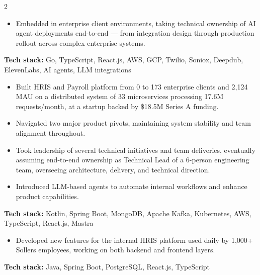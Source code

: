 \documentclass[10pt,a4paper,ragged2e,withhyper]{altacv}
\begin{document}
\begin{paracol}{2}



\begin{itemize}
  \item Embedded in enterprise client environments, taking technical ownership of AI agent deployments end-to-end — from integration design through production rollout across complex enterprise systems.
\end{itemize}
\textbf{Tech stack:} Go, TypeScript, React.js, AWS, GCP, Twilio, Soniox, Deepdub, ElevenLabs, AI agents, LLM integrations

\divider

\begin{itemize}
  \item Built HRIS and Payroll platform from 0 to 173 enterprise clients and 2,124 MAU on a distributed system of 33 microservices processing 17.6M requests/month, at a startup backed by \$18.5M Series A funding.
  \item Navigated two major product pivots, maintaining system stability and team alignment throughout.
  \item Took leadership of several technical initiatives and team deliveries, eventually assuming end-to-end ownership as Technical Lead of a 6-person engineering team, overseeing architecture, delivery, and technical direction.
  \item Introduced LLM-based agents to automate internal workflows and enhance product capabilities.
\end{itemize}
\textbf{Tech stack:} Kotlin, Spring Boot, MongoDB, Apache Kafka, Kubernetes, AWS, TypeScript, React.js, Mastra

\divider

\begin{itemize}
  \item Developed new features for the internal HRIS platform used daily by 1,000+ Sollers employees, working on both backend and frontend layers.
\end{itemize}
\textbf{Tech stack:} Java, Spring Boot, PostgreSQL, React.js, TypeScript


\end{paracol}
\end{document}
